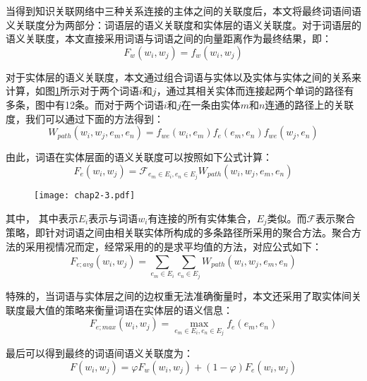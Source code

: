 当得到知识关联网络中三种关系连接的主体之间的关联度后，本文将最终词语间语义关联度分为两部分：词语层的语义关联度和实体层的语义关联度。对于词语层的语义关联度，本文直接采用词语与词语之间的向量距离作为最终结果，即：
\begin{equation}
F_w(w_i, w_j) = f_{w}(w_i, w_j)
\label{F_w}
\end{equation}


\noindent 对于实体层的语义关联度，本文通过组合词语与实体以及实体与实体之间的关系来计算，如图\ref{chap2-3}所示对于两个词语$i$和$j$，通过其相关实体而连接起两个单词的路径有多条，图中有12条。而对于两个词语$i$和$j$在一条由实体$m$和$n$连通的路径上的关联度，我们可以通过下面的方法得到：
\begin{equation}
    W_{path}(w_i, w_j, e_m, e_n) = f_{we}(w_i, e_m)f_e(e_m, e_n)f_{we}(w_j, e_n)
    \label{wpath}
\end{equation}

\noindent 由此，词语在实体层面的语义关联度可以按照如下公式计算：
\begin{equation}
    F_e(w_i, w_j) = \mathscr{F}_{e_m \in E_i,e_n \in E_j}W_{path}(w_i, w_j, e_m, e_n)
    \label{F_e}
\end{equation}

\begin{figure}[!ht]
    \centerline{\texttt{[image: chap2-3.pdf]}}
    \label{chap2-3}
\end{figure}

\noindent 其中， 其中表示$E_i$表示与词语$w_i$有连接的所有实体集合，$E_j$类似。而$\mathscr{F}$表示聚合策略，即针对词语之间由相关联实体所构成的多条路径所采用的聚合方法。聚合方法的采用视情况而定，经常采用的的是求平均值的方法，对应公式如下：
\begin{equation}
    F_{e;avg}(w_i, w_j) = \sum_{e_m \in E_i}^{ }\sum_{e_n \in E_j}^{ }W_{path}(w_i, w_j, e_m, e_n)
    \label{F_e_avg}
\end{equation}

\noindent 特殊的，当词语与实体层之间的边权重无法准确衡量时，本文还采用了取实体间关联度最大值的策略来衡量词语在实体层的语义信息：
\begin{equation}
    F_{e;max}(w_i, w_j) = \max_{e_m \in E_i,e_n \in E_j}f_e(e_m, e_n)
    \label{F_e_max}
\end{equation}

\noindent 最后可以得到最终的词语间语义关联度为：
\begin{equation}
    F(w_i, w_j) = \varphi F_w(w_i, w_j) + (1 - \varphi) F_e(w_i, w_j)
    \label{F}
\end{equation}

